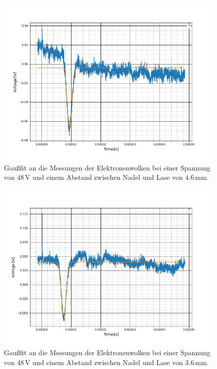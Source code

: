 \begin{figure}
	\includegraphics[scale=0.5]{Bild/S7}
	\centering
	\caption[Gaußfit an Messung bei Konst. Spannung 7]{Gaußfit an die Messungen der Elektronenwolken bei einer Spannung von $48\,$V und einem Abstand zwischen Nadel und Lase von $4.6$\,mm.}
\end{figure}
\begin{figure}
	\includegraphics[scale=0.5]{Bild/S8}
	\centering
	\caption[Gaußfit an Messung bei Konst. Spannung 8]{Gaußfit an die Messungen der Elektronenwolken bei einer Spannung von $48\,$V und einem Abstand zwischen Nadel und Lase von $3.6$\,mm.}
\end{figure}


